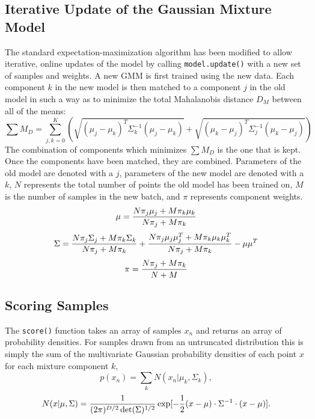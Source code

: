 \documentclass{article}
\begin{document}
\subsection{Iterative Update of the Gaussian Mixture Model}

The standard expectation-maximization algorithm has been modified to allow
iterative, online updates of the model by calling \texttt{model.update()} with
a new set of samples and weights. A new GMM is first trained using the new data.
Each component $k$ in the new model is then matched to a component $j$ in the old
model in such a way as to minimize the total Mahalanobis distance $D_M$ between
all of the means:
\begin{equation}
    \sum M_D = \sum_{j,k=0}^{K} (\sqrt{(\mu_j - \mu_k)^T\Sigma_k^{-1}(\mu_j - \mu_k)}
    + \sqrt{(\mu_k - \mu_j)^T\Sigma_j^{-1}(\mu_k - \mu_j)})
\end{equation}
The combination of components which minimizes $\sum M_D$ is the one that is kept. \\

Once the components have been matched, they are combined. Parameters of the old
model are denoted with a $j$, parameters of the new model are denoted with a
$k$, $N$ represents the total number of points the old model has been trained
on, $M$ is the number of samples in the new batch, and $\pi$ represents
component weights.
\begin{equation}
    \mu = {{N\pi_j\mu_j + M\pi_k\mu_k} \over {N\pi_j + M\pi_k}}
\end{equation}
\begin{equation}
    \Sigma = {{N\pi_j\Sigma_j + M\pi_k\Sigma_k} \over {N\pi_j + M\pi_k}}
    + {{N\pi_j\mu_j\mu_j^T + M\pi_k\mu_k\mu_k^T} \over {N\pi_j + M\pi_k}}
    - \mu\mu^T
\end{equation}
\begin{equation}
    \pi = {{N\pi_j + M\pi_k} \over {N + M}}
\end{equation}

\subsection{Scoring Samples}

The \texttt{score()} function takes an array of samples $x_n$ and returns an
array of probability densities. For samples drawn from an untruncated distribution
this is simply the sum of the multivariate Gaussian probability densities of each
point $x$ for each mixture component $k$,
\begin{equation}
    p(x_n) = \sum_{k} N(x_n | \mu_k, \Sigma_k),
\end{equation}
\begin{equation}
    N(x | \mu, \Sigma) = {1 \over {(2\pi)^{D/2} \det(\Sigma)^{1/2}}}
    \exp[-{1 \over 2} (x - \mu) \cdot \Sigma^{-1} \cdot (x - \mu)].
\end{equation}
\end{document}

